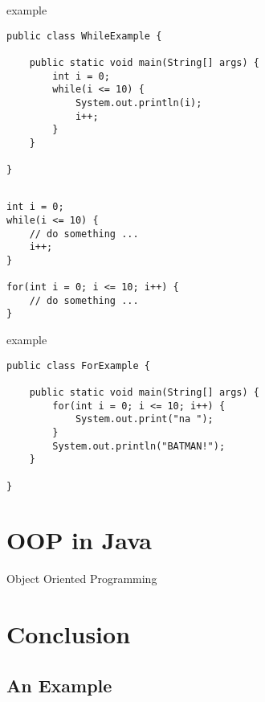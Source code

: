 \begin{frame}[fragile]{ example}
\begin{lstlisting}
public class WhileExample {

    public static void main(String[] args) {
        int i = 0;
        while(i <= 10) {
            System.out.println(i);
            i++;
        }
    }
    
}\end{lstlisting}
\end{frame}

\subsection{}
\begin{frame}[fragile]{}
\begin{lstlisting}
int i = 0;
while(i <= 10) {
    // do something ... 
    i++;
}

for(int i = 0; i <= 10; i++) {
    // do something ... 
}\end{lstlisting}
\end{frame}

\begin{frame}[fragile]{ example}
\begin{lstlisting}
public class ForExample {

    public static void main(String[] args) {
        for(int i = 0; i <= 10; i++) {
            System.out.print("na ");
        }
        System.out.println("BATMAN!");
    }
    
}\end{lstlisting}
\end{frame}


\section{OOP in Java}

\begin{frame}{}
    \begin{center}
        {\huge Object Oriented Programming}
    \end{center}
\end{frame}

\section{Conclusion}
\subsection{An Example}


